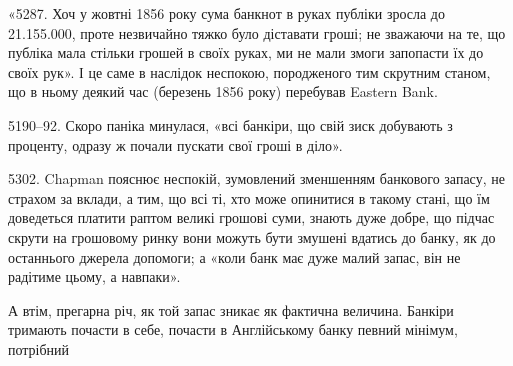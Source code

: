 «5287. Хоч у жовтні 1856 року сума банкнот в руках публіки зросла
до \num{21.155.000}, проте незвичайно тяжко було діставати гроші; не зважаючи
на те, що публіка мала стільки грошей в своїх руках, ми не мали змоги запопасти
їх до своїх рук». І це саме в наслідок неспокою, породженого тим
скрутним станом, що в ньому деякий час (березень 1856 року) перебував
Eastern Bank.

5190--92. Скоро паніка минулася, «всі банкіри, що свій зиск добувають
з проценту, одразу ж почали пускати свої гроші в діло».

5302. Chapman пояснює неспокій, зумовлений зменшенням банкового
запасу, не страхом за вклади, а тим, що всі ті, хто може опинитися в такому
стані, що їм доведеться платити раптом великі грошові суми, знають дуже добре,
що підчас скрути на грошовому ринку вони можуть бути змушені вдатись до
банку, як до останнього джерела допомоги; а «коли банк має дуже малий запас,
він не радітиме цьому, а навпаки».

А втім, прегарна річ, як той запас зникає як фактична величина. Банкіри
тримають почасти в себе, почасти в Англійському банку певний мінімум, потрібний
\parbreak{}  %
